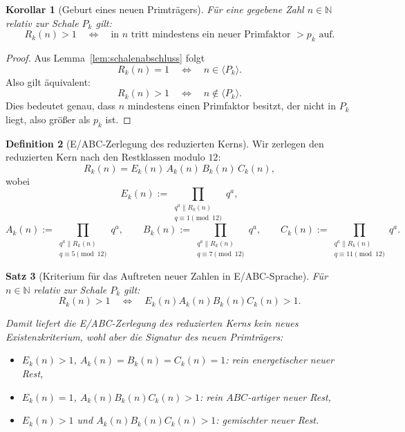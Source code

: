 \documentclass[11pt,a4paper]{article}
\newtheorem{satz}{Satz}
\newtheorem{korollar}[satz]{Korollar}
\theoremstyle{definition}
\newtheorem{definition}[satz]{Definition}
\theoremstyle{remark}
\begin{document}
	\begin{korollar}[Geburt eines neuen Primträgers]
		\label{kor:geburt_neuer_primtraeger}
		Für eine gegebene Zahl \(n\in\mathbb N\) relativ zur Schale \(P_k\) gilt:
		\[
		R_k(n)>1
		\quad\Longleftrightarrow\quad
		\text{in } n \text{ tritt mindestens ein neuer Primfaktor } >p_k \text{ auf.}
		\]
	\end{korollar}
	
	\begin{proof}
		Aus Lemma~\ref{lem:schalenabschluss} folgt
		\[
		R_k(n)=1
		\quad\Longleftrightarrow\quad
		n\in\langle P_k\rangle.
		\]
		Also gilt äquivalent:
		\[
		R_k(n)>1
		\quad\Longleftrightarrow\quad
		n\notin \langle P_k\rangle.
		\]
		Dies bedeutet genau, dass \(n\) mindestens einen Primfaktor besitzt, der nicht in \(P_k\)
		liegt, also größer als \(p_k\) ist.
	\end{proof}
	
	\begin{definition}[E/ABC-Zerlegung des reduzierten Kerns]
		Wir zerlegen den reduzierten Kern nach den Restklassen modulo \(12\):
		\[
		R_k(n)=E_k(n)\,A_k(n)\,B_k(n)\,C_k(n),
		\]
		wobei
		\[
		E_k(n):=\prod_{\substack{q^a\parallel R_k(n)\\ q\equiv 1\pmod{12}}} q^a,
		\]
		\[
		A_k(n):=\prod_{\substack{q^a\parallel R_k(n)\\ q\equiv 5\pmod{12}}} q^a,\qquad
		B_k(n):=\prod_{\substack{q^a\parallel R_k(n)\\ q\equiv 7\pmod{12}}} q^a,\qquad
		C_k(n):=\prod_{\substack{q^a\parallel R_k(n)\\ q\equiv 11\pmod{12}}} q^a.
		\]
	\end{definition}
	
	\begin{satz}[Kriterium für das Auftreten neuer Zahlen in E/ABC-Sprache]
		\label{satz:eabc_kriterium_neue_zahl}
		Für \(n\in\mathbb N\) relativ zur Schale \(P_k\) gilt:
		\[
		R_k(n)>1
		\quad\Longleftrightarrow\quad
		E_k(n)A_k(n)B_k(n)C_k(n)>1.
		\]
		
		Damit liefert die E/ABC-Zerlegung des reduzierten Kerns kein neues Existenzkriterium,
		wohl aber die \emph{Signatur} des neuen Primträgers:
		\begin{itemize}
			\item \(E_k(n)>1\), \(A_k(n)=B_k(n)=C_k(n)=1\): rein energetischer neuer Rest,
			\item \(E_k(n)=1\), \(A_k(n)B_k(n)C_k(n)>1\): rein \(ABC\)-artiger neuer Rest,
			\item \(E_k(n)>1\) und \(A_k(n)B_k(n)C_k(n)>1\): gemischter neuer Rest.
		\end{itemize}
	\end{satz}
	
\end{document}
